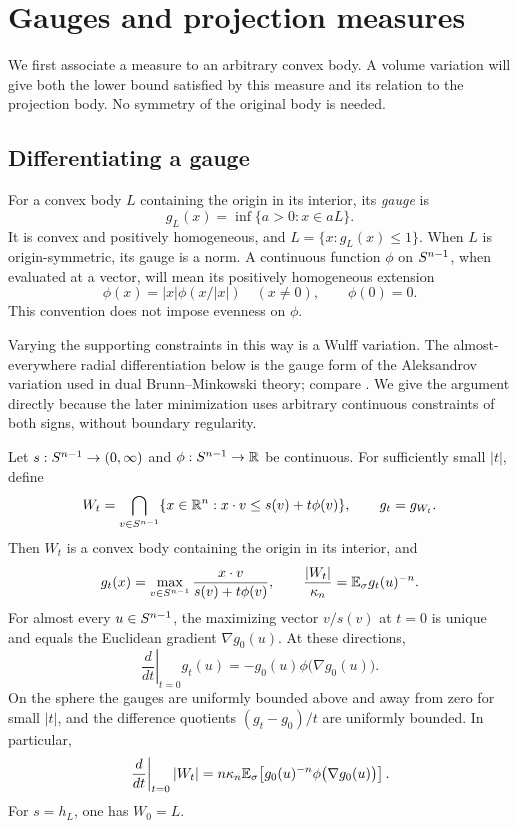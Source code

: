 \section{Gauges and projection measures}\label{sec:gauges}

We first associate a measure to an arbitrary convex body.  A volume
variation will give both the lower bound satisfied by this measure and
its relation to the projection body.  No symmetry of the original body
is needed.

\subsection{Differentiating a gauge}

For a convex body $L$ containing the origin in its interior, its
\emph{gauge} is
\[
 g_L(x)=\inf\{a>0:x\in aL\}.
\]
It is convex and positively homogeneous, and $L=\{x:g_L(x)\le1\}$.
When $L$ is origin-symmetric, its gauge is a norm.  A continuous function
$\phi$ on $S^{n-1}$, when evaluated at a vector, will mean its positively
homogeneous extension
\[
 \phi(x)=|x|\phi(x/|x|)\quad(x\ne0),\qquad \phi(0)=0.
\]
This convention does not impose evenness on $\phi$.

Varying the supporting constraints in this way is a Wulff variation.
The almost-everywhere radial differentiation below is the gauge form
of the Aleksandrov variation used in dual Brunn--Minkowski theory;
compare \cite[Lemmas~4.1--4.3 and Corollary~4.9]{HuangLutwakYangZhang2016}. We give the
argument directly because the later minimization uses arbitrary
continuous constraints of both signs, without boundary regularity.

\begin{lemma}\label{lem:gauge-variation}
Let $s:S^{n-1}\to(0,\infty)$ and $\phi:S^{n-1}\to\mathbb R$ be continuous.  For
sufficiently small $|t|$, define
\[
 W_t=\bigcap_{v\in S^{n-1}}\{x\in\mathbb R^n:x\cdot v\le s(v)+t\phi(v)\},
 \qquad g_t=g_{W_t}.
\]
Then $W_t$ is a convex body containing the origin in its interior, and
\begin{equation}\label{eq:gauge-formulas}
 g_t(x)=\max_{v\in S^{n-1}}\frac{x\cdot v}{s(v)+t\phi(v)},
 \qquad
 \frac{|W_t|}{\kappa_n}=\mathbb E_{\sigma} g_t(u)^{-n}.
\end{equation}
For almost every $u\in S^{n-1}$, the maximizing vector $v/s(v)$ at $t=0$
is unique and equals the Euclidean gradient $\nabla g_0(u)$.  At these
directions,
\begin{equation}\label{eq:gauge-derivative}
 \left.\frac{d}{dt}\right|_{t=0}g_t(u)
 =-g_0(u)\phi\bigl(\nabla g_0(u)\bigr).
\end{equation}
On the sphere the gauges are uniformly bounded above and away from
zero for small $|t|$, and the difference quotients
$(g_t-g_0)/t$ are uniformly bounded.  In particular,
\begin{equation}\label{eq:constraint-volume-derivative}
 \left.\frac{d}{dt}\right|_{t=0}|W_t|
 =n\kappa_n\mathbb E_{\sigma}\!\left[
   g_0(u)^{-n}\phi\bigl(\nabla g_0(u)\bigr)\right].
\end{equation}
For $s=h_L$, one has $W_0=L$.
\end{lemma}

